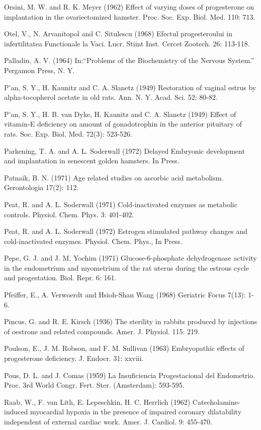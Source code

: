 Orsini, M. W. and R. K. Meyer (1962) Effect of varying doses of progesterone on implantation in the ovariectomized hamster. Proc. Soc. Exp. Biol. Med. 110: 713.

Otel, V., N. Arvanitopol and C. Situlescu (1968) Efectul progesteroului in infertilitatea Functionale la Vaci. Lucr. Stiint Inst. Cercet Zootech. 26: 113-118.

Palladin, A. V. (1964) In:``Problems of the Biochemistry of the Nervous System.'' Pergamon Press, N. Y.

P'an, S. Y., H. Kaunitz and C. A. Slanetz (1949) Restoration of vaginal estrus by alpha-tocopherol acetate in old rats. Ann. N. Y. Acad. Sci. 52: 80-82.

P'an, S. Y., H. B. van Dyke, H. Kaunitz and C. A. Slanetz (1949) Effect of vitamin-E deficiency on amount of gonadotrophin in the anterior pituitary of rats. Soc. Exp. Biol. Med. 72(3): 523-526.

Parkening, T. A. and A. L. Soderwall (1972) Delayed Embryonic development and implantation in senescent golden hamsters. In Press.

Patnaik, B. N. (1971) Age related studies on ascorbic acid metabolism. Gerontologia 17(2): 112.

Peat, R. and A. L. Soderwall (1971) Cold-inactivated enzymes as metabolic controls. Physiol. Chem. Phys. 3: 401-402.

Peat, R. and A. L. Soderwall (1972) Estrogen stimulated pathway changes and cold-inactivated enzymes. Physiol. Chem. Phys., In Press.

Pepe, G. J. and J. M. Yochim (1971) Glucose-6-phosphate dehydrogenase activity in the endometrium and myometrium of the rat uterus during the estrous cycle and progestation. Biol. Repr. 6: 161.

Pfeiffer, E., A. Verwoerdt and Hsioh-Shan Wang (1968) Geriatric Focus 7(13): 1-6.

Pincus, G. and R. E. Kirsch (1936) The sterility in rabbits produced by injections of oestrone and related compounds. Amer. J. Physiol. 115: 219.

Poulson, E., J. M. Robson, and F. M. Sullivan (1963) Embryopathic effects of progesterone deficiency. J. Endocr. 31: xxviii.

Pous, D. L. and J. Comas (1959) La Insuficiencia Progestacional del Endometrio. Proc. 3rd World Congr. Fert. Ster. (Amsterdam): 593-595.

Raab, W., F. van Lith, E. Lepeschkin, H. C. Herrlich (1962) Catecholamine-induced myocardial hypoxia in the presence of impaired coronary dilatability independent of external cardiac work. Amer. J. Cardiol. 9: 455-470.

